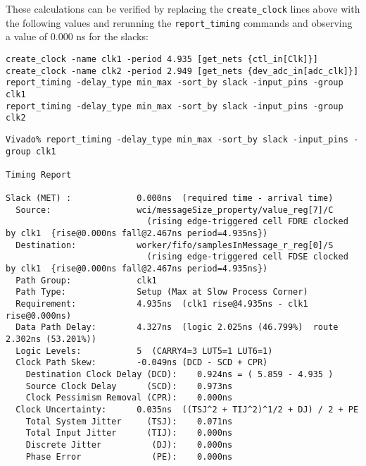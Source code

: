 \documentclass{article}
\begin{document}
\fontsize{10}{12}\selectfont
These calculations can be verified by replacing the \texttt{create\_clock} lines above with the following values and rerunning the \texttt{report\_timing} commands and observing a value of 0.000 ns for the slacks:
\begin{lstlisting}
create_clock -name clk1 -period 4.935 [get_nets {ctl_in[Clk]}]
create_clock -name clk2 -period 2.949 [get_nets {dev_adc_in[adc_clk]}]
report_timing -delay_type min_max -sort_by slack -input_pins -group clk1
report_timing -delay_type min_max -sort_by slack -input_pins -group clk2
\end{lstlisting}
\fontsize{6}{12}\selectfont
\begin{lstlisting}
Vivado% report_timing -delay_type min_max -sort_by slack -input_pins -group clk1

Timing Report

Slack (MET) :             0.000ns  (required time - arrival time)
  Source:                 wci/messageSize_property/value_reg[7]/C
                            (rising edge-triggered cell FDRE clocked by clk1  {rise@0.000ns fall@2.467ns period=4.935ns})
  Destination:            worker/fifo/samplesInMessage_r_reg[0]/S
                            (rising edge-triggered cell FDSE clocked by clk1  {rise@0.000ns fall@2.467ns period=4.935ns})
  Path Group:             clk1
  Path Type:              Setup (Max at Slow Process Corner)
  Requirement:            4.935ns  (clk1 rise@4.935ns - clk1 rise@0.000ns)
  Data Path Delay:        4.327ns  (logic 2.025ns (46.799%)  route 2.302ns (53.201%))
  Logic Levels:           5  (CARRY4=3 LUT5=1 LUT6=1)
  Clock Path Skew:        -0.049ns (DCD - SCD + CPR)
    Destination Clock Delay (DCD):    0.924ns = ( 5.859 - 4.935 )
    Source Clock Delay      (SCD):    0.973ns
    Clock Pessimism Removal (CPR):    0.000ns
  Clock Uncertainty:      0.035ns  ((TSJ^2 + TIJ^2)^1/2 + DJ) / 2 + PE
    Total System Jitter     (TSJ):    0.071ns
    Total Input Jitter      (TIJ):    0.000ns
    Discrete Jitter          (DJ):    0.000ns
    Phase Error              (PE):    0.000ns


\end{lstlisting}
\end{document}
